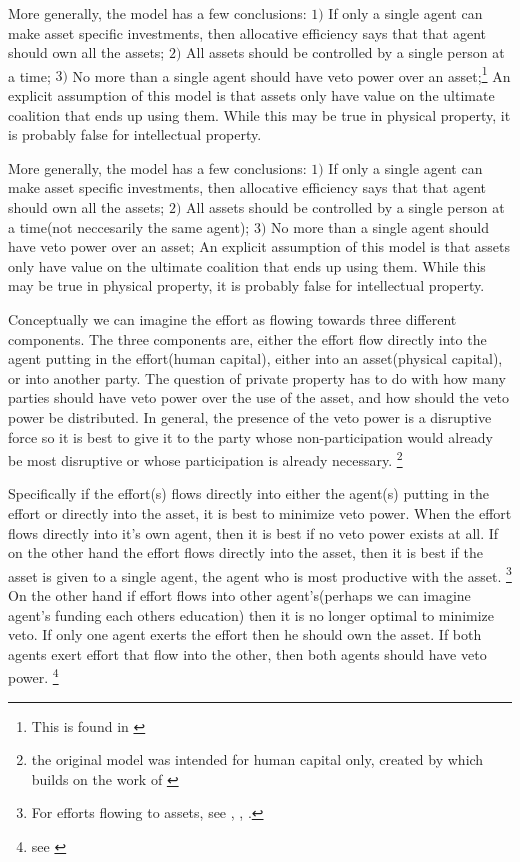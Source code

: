 \documentclass[12pt]{article}
\numberwithin{equation}{section}
\begin{document}
More generally, the model has a few conclusions: $1)$ If only a single agent can make asset specific investments, then allocative efficiency says that that agent should own all the assets; $2)$ All assets should be controlled by a single person at a time; $3)$ No more than a single agent should have veto power over an asset;\footnote{This is found in \cite{Hart1990}} An explicit assumption of this model is that assets only have value on the ultimate coalition that ends up using them. While this may be true in physical property, it is probably false for intellectual property.

More generally, the model has a few conclusions: $1)$ If only a single agent can make asset specific investments, then allocative efficiency says that that agent should own all the assets; $2)$ All assets should be controlled by a single person at a time(not neccesarily the same agent); $3)$ No more than a single agent should have veto power over an asset; An explicit assumption of this model is that assets only have value on the ultimate coalition that ends up using them. While this may be true in physical property, it is probably false for intellectual property.

Conceptually we can imagine the effort as flowing towards three different components. The three components are, either the effort flow directly into the agent putting in the effort(human capital), either into an asset(physical capital), or into another party. The question of private property has to do with how many parties should have veto power over the use of the asset, and how should the veto power be distributed. In general, the presence of the veto power is a disruptive force so it is best to give it to the party whose non-participation would already be most disruptive or whose participation is already necessary. \footnote{the original model was intended for human capital only, created by \cite{Hart1990} which builds on the work of \cite{Grossman1986} }

Specifically if the effort(s) flows directly into either the agent(s) putting in the effort or directly into the asset, it is best to minimize veto power. When the effort flows directly into it's own agent, then it is best if no veto power exists at all. If on the other hand the effort flows directly into the asset, then it is best if the asset is given to a single agent, the agent who is most productive with the asset. \footnote{For efforts flowing to assets, see \cite{schmitz2013investments}, \citet{gattai2016investment}, \cite{schmitz2017incomplete}. } On the other hand if effort flows into other agent's(perhaps we can imagine agent's funding each others education) then it is no longer optimal to minimize veto. If only one agent exerts the effort then he should own the asset. If both agents exert effort that flow into the other, then both agents should have veto power. \footnote{see \cite{hamada2011incentive}}
\end{document}
